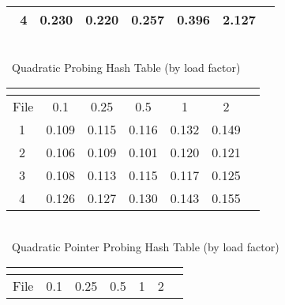 \documentclass[8]{report}
\begin{document}
\begin{table}[ht]
\begin{threeparttable}
\begin{tabular}{l*{6}{c}}
 \       4  &   0.230  &    0.220  &   0.257 & 0.396   & 2.127           \\
 

\hline 

\end{tabular}

\    \\


\ Quadratic Probing Hash Table (by load factor)  \\
\begin{tabular}{l*{6}{c}}
 
   &\multicolumn{1}{c}{}  &\multicolumn{1}{c}{}   &\multicolumn{1}{c}{} &\multicolumn{1}{c}{}  &\multicolumn{1}{c}{}   \\
\hline\hline


     \multicolumn{1}{c}{File }  &\multicolumn{1}{c}{0.1}   &\multicolumn{1}{c}{0.25} &\multicolumn{1}{c}{0.5}  &\multicolumn{1}{c}{1} &\multicolumn{1}{c}{2}   \\


\hline


\    1  &     0.109  &   0.115   &   0.116  &  0.132  &  0.149   \\
                       

\       2&      0.106 &   0.109 &   0.101  &   0.120  &  0.121             \\
                  
\       3&     0.108   &  0.113  &  0.115  &  0.117   & 0.125       \\
     
 \       4  &   0.126  &    0.127  &   0.130 & 0.143   & 0.155           \\
 

\hline 

\end{tabular}

\    \\

\ Quadratic Pointer Probing Hash Table (by load factor) \\
\begin{tabular}{l*{6}{c}}
   &\multicolumn{1}{c}{}  &\multicolumn{1}{c}{}   &\multicolumn{1}{c}{} &\multicolumn{1}{c}{}  &\multicolumn{1}{c}{}   \\
\hline\hline


     \multicolumn{1}{c}{File }  &\multicolumn{1}{c}{0.1}   &\multicolumn{1}{c}{0.25} &\multicolumn{1}{c}{0.5}  &\multicolumn{1}{c}{1} &\multicolumn{1}{c}{2}   \\



\end{tabular}
\end{threeparttable}
\end{table}
\end{document}
